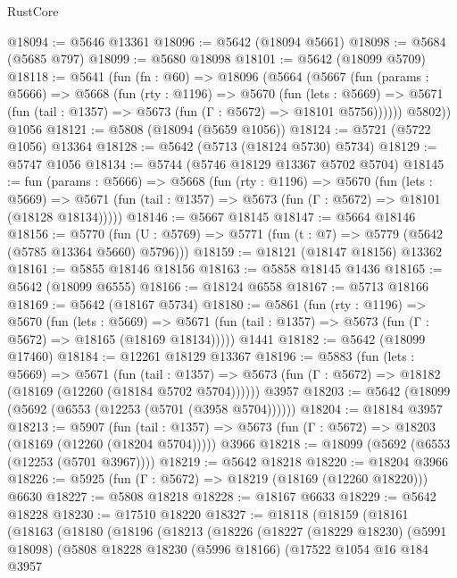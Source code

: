 \begin{lexlean}{RustCore}
\begin{coremodule}
@18094 := @5646 @13361
@18096 := @5642 (@18094 @5661)
@18098 := @5684 (@5685 @797)
@18099 := @5680 @18098
@18101 := @5642 (@18099 @5709)
@18118 := @5641
    (fun (fn : @60) =>
    @18096
      (@5664
        (@5667
          (fun (params : @5666) =>
          @5668
            (fun (rty : @1196) =>
            @5670
              (fun (lets : @5669) =>
              @5671 (fun (tail : @1357) => @5673 (fun (Γ : @5672) => @18101 @5756))))))
        @5802))
    @1056
@18121 := @5808 (@18094 (@5659 @1056))
@18124 := @5721 (@5722 @1056) @13364
@18128 := @5642 (@5713 (@18124 @5730) @5734)
@18129 := @5747 @1056
@18134 := @5744 (@5746 @18129 @13367 @5702 @5704)
@18145 := fun (params : @5666) =>
  @5668
    (fun (rty : @1196) =>
    @5670
      (fun (lets : @5669) =>
      @5671 (fun (tail : @1357) => @5673 (fun (Γ : @5672) => @18101 (@18128 @18134)))))
@18146 := @5667 @18145
@18147 := @5664 @18146
@18156 := @5770
    (fun (U : @5769) => @5771 (fun (t : @7) => @5779 (@5642 (@5785 @13364 @5660) @5796)))
@18159 := @18121 (@18147 @18156) @13362
@18161 := @5855 @18146 @18156
@18163 := @5858 @18145 @1436
@18165 := @5642 (@18099 @6555)
@18166 := @18124 @6558
@18167 := @5713 @18166
@18169 := @5642 (@18167 @5734)
@18180 := @5861
    (fun (rty : @1196) =>
    @5670
      (fun (lets : @5669) =>
      @5671 (fun (tail : @1357) => @5673 (fun (Γ : @5672) => @18165 (@18169 @18134)))))
    @1441
@18182 := @5642 (@18099 @17460)
@18184 := @12261 @18129 @13367
@18196 := @5883
    (fun (lets : @5669) =>
    @5671
      (fun (tail : @1357) =>
      @5673 (fun (Γ : @5672) => @18182 (@18169 (@12260 (@18184 @5702 @5704))))))
    @3957
@18203 := @5642 (@18099 (@5692 (@6553 (@12253 (@5701 (@3958 @5704))))))
@18204 := @18184 @3957
@18213 := @5907
    (fun (tail : @1357) => @5673 (fun (Γ : @5672) => @18203 (@18169 (@12260 (@18204 @5704)))))
    @3966
@18218 := @18099 (@5692 (@6553 (@12253 (@5701 @3967))))
@18219 := @5642 @18218
@18220 := @18204 @3966
@18226 := @5925 (fun (Γ : @5672) => @18219 (@18169 (@12260 @18220))) @6630
@18227 := @5808 @18218
@18228 := @18167 @6633
@18229 := @5642 @18228
@18230 := @17510 @18220
@18327 := @18118
    (@18159
      (@18161
        (@18163
          (@18180
            (@18196
              (@18213
                (@18226
                  (@18227
                    (@18229 @18230)
                    (@5991 @18098)
                    (@5808
                      @18228
                      @18230
                      (@5996 @18166)
                      (@17522
                        @1054
                        @16
                        @184
                        @3957

\end{coremodule}
\end{lexlean}
